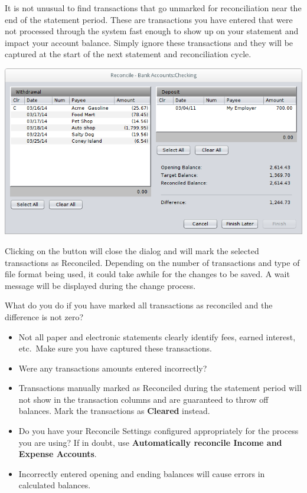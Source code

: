 \documentclass[letterpaper,12pt]{book}
\begin{document}
    It is not unusual to find transactions that go unmarked for reconciliation near
    the end of the statement period. These are transactions you have entered that
    were not processed through the system fast enough to show up on your statement
    and impact your account balance. Simply ignore these transactions and they will
    be captured at the start of the next statement and reconciliation cycle.

    \newpage
    \includegraphics[width=0.8\linewidth]{images/reconcile-dialog}

    Clicking on the  button will close the dialog and will mark the selected transactions as Reconciled.
    Depending on the number of transactions and type of file format being used, it could take awhile for the changes
    to be saved.
    A wait message will be displayed during the change process.

    What do you do if you have marked all transactions as reconciled and the difference is not zero?

    \begin{itemize}
        \item Not all paper and electronic statements clearly identify fees, earned
        interest, etc.\ Make sure you have captured these transactions.
        \item Were any transactions amounts entered incorrectly?
        \item Transactions manually marked as Reconciled during the statement period will
        not show in the transaction columns and are guaranteed to throw off balances.
        Mark the transactions as \textbf{Cleared} instead.
        \item Do you have your Reconcile Settings configured appropriately for the process
        you are using? If in doubt, use \textbf{Automatically reconcile Income and Expense Accounts}.
        \item Incorrectly entered opening and ending balances will cause errors in calculated balances.
    \end{itemize}
\end{document}
